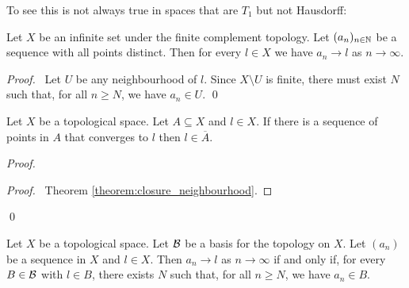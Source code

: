 To see this is not always true in spaces that are $T_1$ but not Hausdorff:

\begin{proposition}
    Let $X$ be an infinite set under the finite complement topology. Let $(a_n)_{n \in \mathbb{N}}$ be a sequence
    with all points distinct. Then for every $l \in X$ we have $a_n \rightarrow l$ as
    $n \rightarrow \infty$.
\end{proposition}

\begin{proof}
    \pf\ Let $U$ be any neighbourhood of $l$. Since $X \setminus U$ is finite, there must exist $N$
    such that, for all $n \geq N$, we have $a_n \in U$. \qed
\end{proof}

\begin{lemma}
    \label{lemma:sequence_lemma1}
    Let $X$ be a topological space. Let $A \subseteq X$ and $l \in X$. If there is a sequence of points in $A$ that converges to $l$ then $l \in \overline{A}$.
\end{lemma}

\begin{proof}
    \pf
    \qedstep
    \begin{proof}
        \pf\ Theorem \ref{theorem:closure_neighbourhood}.
    \end{proof}
    \qed
\end{proof}

\begin{proposition}
    \label{proposition:convergence_basis}
    Let $X$ be a topological space. Let $\mathcal{B}$ be a basis for the topology on $X$.
    Let $(a_n)$ be a sequence in $X$ and $l \in X$. Then $a_n \rightarrow l$ as
    $n \rightarrow \infty$ if and only if, for every $B \in \mathcal{B}$ with $l \in B$,
    there exists $N$ such that, for all $n \geq N$, we have $a_n \in B$.
\end{proposition}

